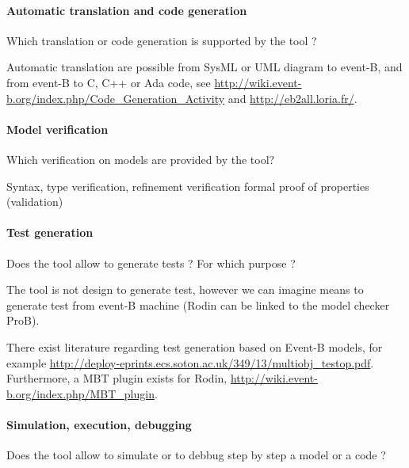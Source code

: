 \paragraph{Automatic translation and code generation}
Which translation or code generation is supported by the tool ?

\begin{author_comment}
Automatic translation are possible from SysML  or UML diagram to event-B, and from event-B to C, C++  or Ada code, see \url{http://wiki.event-b.org/index.php/Code_Generation_Activity} and \url{http://eb2all.loria.fr/}.
\end{author_comment}

\paragraph{Model verification}
Which verification on models are provided by the tool?

\begin{author_comment}

Syntax, type verification,
refinement verification
formal proof of properties (validation)
\end{author_comment}

\paragraph{Test generation}
Does the tool allow to generate tests ? For  which purpose ?

\begin{author_comment}

The tool is not design to generate test, however we can imagine means to  generate test from event-B machine (Rodin can be linked to the model checker ProB).
\end{author_comment}

\begin{assessor2}
  There exist literature regarding test generation based on Event-B
  models, for example
  \url{http://deploy-eprints.ecs.soton.ac.uk/349/13/multiobj_testop.pdf}. Furthermore,
  a MBT plugin exists for Rodin,
  \url{http://wiki.event-b.org/index.php/MBT_plugin}.
\end{assessor2}

\paragraph{Simulation, execution, debugging}
Does the tool allow to simulate or to debbug step by step a model or a code ?

